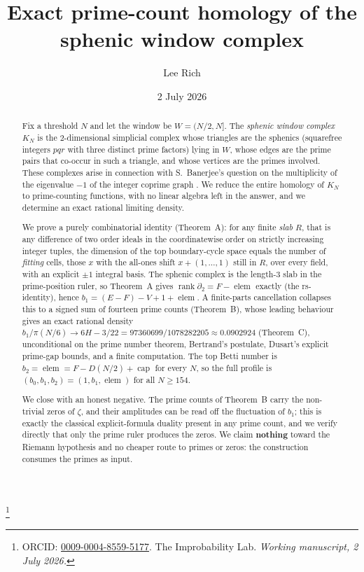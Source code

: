 \documentclass[11pt,reqno]{amsart}
\theoremstyle{plain}
\theoremstyle{definition}
\theoremstyle{plain}
\newcommand{\rank}{\operatorname{rank}}
\newcommand{\elem}{\operatorname{elem}}
\newcommand{\cpc}{\operatorname{cap}}
\begin{document}
\title[Exact prime-count homology of the sphenic window complex]
{Exact prime-count homology of the sphenic window complex}
\author{Lee Rich}
\thanks{ORCID: \href{https://orcid.org/0009-0004-8559-5177}{0009-0004-8559-5177}.
The Improbability Lab. \emph{Working manuscript, 2 July 2026.}}
\date{2 July 2026}

\begin{abstract}
Fix a threshold $N$ and let the window be $W=(N/2,N]$. The \emph{sphenic window complex}
$K_N$ is the $2$-dimensional simplicial complex whose triangles are the sphenics (squarefree
integers $pqr$ with three distinct prime factors) lying in $W$, whose edges are the prime
pairs that co-occur in such a triangle, and whose vertices are the primes involved. These
complexes arise in connection with S.~Banerjee's question on the multiplicity of the
eigenvalue $-1$ of the integer coprime graph \cite{Banerjee2025}. We reduce the entire
homology of $K_N$ to prime-counting functions, with no linear algebra left in the answer, and
we determine an exact rational limiting density.

We prove a purely combinatorial identity (Theorem~A): for any finite \emph{slab} $R$, that is
any difference of two order ideals in the coordinatewise order on strictly increasing integer
tuples, the dimension of the top boundary-cycle space equals the number of \emph{fitting}
cells, those $x$ with the all-ones shift $x+(1,\dots,1)$ still in $R$, over every field, with
an explicit $\pm1$ integral basis. The sphenic complex is the length-$3$ slab in the
prime-position ruler, so Theorem~A gives $\rank\partial_2=F-\elem$ exactly (the rs-identity),
hence $b_1=(E-F)-V+1+\elem$. A finite-parts cancellation collapses this to a signed sum of
fourteen prime counts (Theorem~B), whose leading behaviour gives an exact rational density
$b_1/\pi(N/6)\to 6H-3/22=97360699/1078282205\approx0.0902924$ (Theorem~C), unconditional on
the prime number theorem, Bertrand's postulate, Dusart's explicit prime-gap bounds, and a
finite computation. The top Betti number is $b_2=\elem=F-D(N/2)+\cpc$ for every $N$, so the
full profile is $(b_0,b_1,b_2)=(1,b_1,\elem)$ for all $N\ge154$.

We close with an honest negative. The prime counts of Theorem~B carry the non-trivial zeros
of $\zeta$, and their amplitudes can be read off the fluctuation of $b_1$; this is exactly the
classical explicit-formula duality present in any prime count, and we verify directly that
only the prime ruler produces the zeros. We claim \textbf{nothing} toward the Riemann
hypothesis and no cheaper route to primes or zeros: the construction consumes the primes as
input.
\end{abstract}
\end{document}
